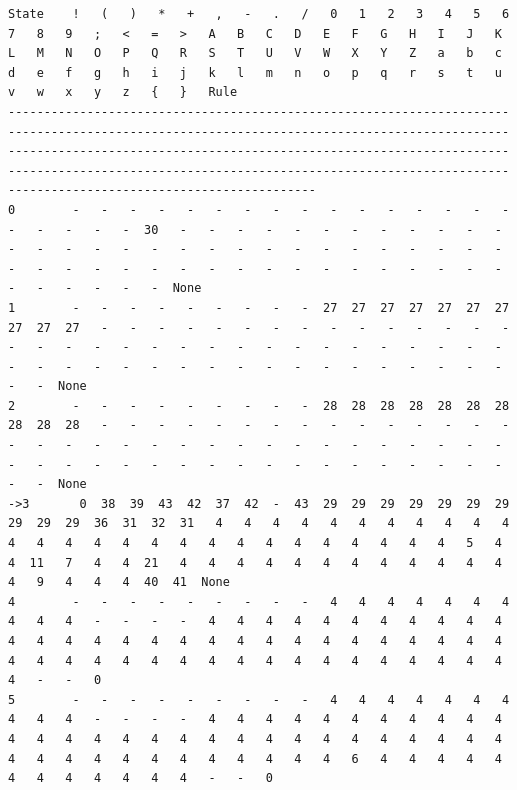 \documentclass[11pt,a4paper]{article}
\begin{document}
\begin{landscape}
\small
\begin{verbatim}
State    !   (   )   *   +   ,   -   .   /   0   1   2   3   4   5   6   7   8   9   ;   <   =   >   A   B   C   D   E   F   G   H   I   J   K   L   M   N   O   P   Q   R   S   T   U   V   W   X   Y   Z   a   b   c   d   e   f   g   h   i   j   k   l   m   n   o   p   q   r   s   t   u   v   w   x   y   z   {   }   Rule
-----------------------------------------------------------------------------------------------------------------------------------------------------------------------------------------------------------------------------------------------------------------------------------------------------------------------------------
0        -   -   -   -   -   -   -   -   -   -   -   -   -   -   -   -   -   -   -   -   -  30   -   -   -   -   -   -   -   -   -   -   -   -   -   -   -   -   -   -   -   -   -   -   -   -   -   -   -   -   -   -   -   -   -   -   -   -   -   -   -   -   -   -   -   -   -   -   -   -   -   -   -   -   -   -  None
1        -   -   -   -   -   -   -   -   -  27  27  27  27  27  27  27  27  27  27   -   -   -   -   -   -   -   -   -   -   -   -   -   -   -   -   -   -   -   -   -   -   -   -   -   -   -   -   -   -   -   -   -   -   -   -   -   -   -   -   -   -   -   -   -   -   -   -   -   -   -   -   -  None
2        -   -   -   -   -   -   -   -   -  28  28  28  28  28  28  28  28  28  28   -   -   -   -   -   -   -   -   -   -   -   -   -   -   -   -   -   -   -   -   -   -   -   -   -   -   -   -   -   -   -   -   -   -   -   -   -   -   -   -   -   -   -   -   -   -   -   -   -   -   -   -   -  None
->3       0  38  39  43  42  37  42  -  43  29  29  29  29  29  29  29  29  29  29  36  31  32  31   4   4   4   4   4   4   4   4   4   4   4   4   4   4   4   4   4   4   4   4   4   4   4   4   4   4   4   5   4   4  11   7   4   4  21   4   4   4   4   4   4   4   4   4   4   4   4   4   9   4   4   4  40  41  None
4        -   -   -   -   -   -   -   -   -   4   4   4   4   4   4   4   4   4   4   -   -   -   -   4   4   4   4   4   4   4   4   4   4   4   4   4   4   4   4   4   4   4   4   4   4   4   4   4   4   4   4   4   4   4   4   4   4   4   4   4   4   4   4   4   4   4   4   4   4   4   4   -   -   0
5        -   -   -   -   -   -   -   -   -   4   4   4   4   4   4   4   4   4   4   -   -   -   -   4   4   4   4   4   4   4   4   4   4   4   4   4   4   4   4   4   4   4   4   4   4   4   4   4   4   4   4   4   4   4   4   4   4   4   4   4   4   4   4   4   6   4   4   4   4   4   4   4   4   4   4   4   4   -   -   0

\end{verbatim}
\end{landscape}
\end{document}
